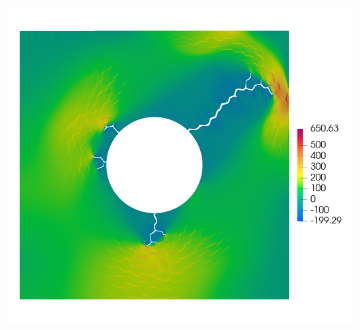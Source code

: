 \begin{figure}[htb!]
\begin{subfigure}[t]{0.3\linewidth}
    \caption{}
  \end{subfigure}
  \begin{subfigure}[t]{0.3\linewidth}
    \centering
    \includegraphics[width=\linewidth]{Chapter3/figures/r5_ext0_stress}
    \caption{}
  \end{subfigure}
  

\end{figure}
